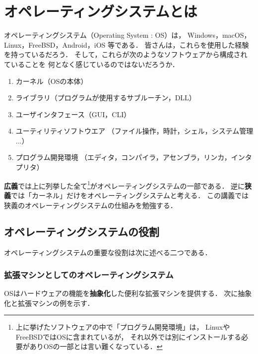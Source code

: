 \chapter{オペレーティングシステムとは}

オペレーティングシステム（Operating System : OS）は，
Windows，macOS，Linux，FreeBSD，Android，iOS
等である．
皆さんは，これらを使用した経験を持っているだろう．
そして，これらが次のようなソフトウェアから構成されていることを
何となく感じているのではないだろうか．

\begin{enumerate}
\item カーネル（OSの本体）
\item ライブラリ（プログラムが使用するサブルーチン，DLL）
\item ユーザインタフェース（GUI，CLI）
\item ユーティリティソフトウエア
  （ファイル操作，時計，シェル，システム管理 ...）
\item プログラム開発環境
  （エディタ，コンパイラ，アセンブラ，リンカ，インタプリタ）
\end{enumerate}

{\bf 広義}では上に列挙した全て\footnote{
上に挙げたソフトウェアの中で「プログラム開発環境」は，
LinuxやFreeBSDではOSに含まれているが，
それ以外では別にインストールする必要がありOSの一部とは言い難くなっている．
}がオペレーティングシステムの一部である．
逆に{\bf 狭義}では「カーネル」だけをオペレーティングシステムと考える．
この講義では狭義のオペレーティングシステムの仕組みを勉強する．

\section{オペレーティングシステムの役割}
\label{osRole}

オペレーティングシステムの重要な役割は次に述べる二つである．

\subsection{拡張マシンとしてのオペレーティングシステム}
\label{abstruction}

OSはハードウェアの機能を{\bf 抽象化}した便利な拡張マシンを提供する．
次に抽象化と拡張マシンの例を示す．

